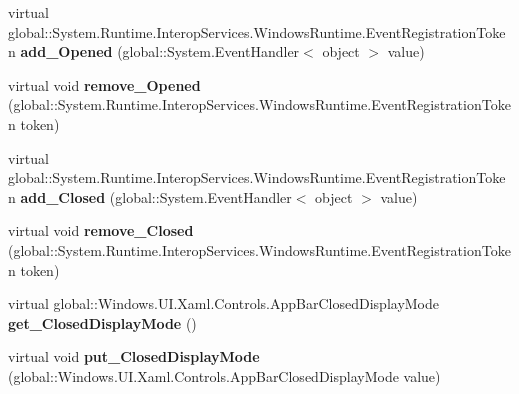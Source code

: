 \begin{DoxyCompactItemize}
\mbox{\label{class_windows_1_1_u_i_1_1_xaml_1_1_controls_1_1_app_bar_ad5f3931660e32abe22fcee131b86c49d}} 
virtual global\+::\+System.\+Runtime.\+Interop\+Services.\+Windows\+Runtime.\+Event\+Registration\+Token {\bfseries add\+\_\+\+Opened} (global\+::\+System.\+Event\+Handler$<$ object $>$ value)
\item 
\mbox{\label{class_windows_1_1_u_i_1_1_xaml_1_1_controls_1_1_app_bar_ac34208d86f3483385078caf53adad003}} 
virtual void {\bfseries remove\+\_\+\+Opened} (global\+::\+System.\+Runtime.\+Interop\+Services.\+Windows\+Runtime.\+Event\+Registration\+Token token)
\item 
\mbox{\label{class_windows_1_1_u_i_1_1_xaml_1_1_controls_1_1_app_bar_a4a1f77613cd6cf4250c8b5d04fb9f853}} 
virtual global\+::\+System.\+Runtime.\+Interop\+Services.\+Windows\+Runtime.\+Event\+Registration\+Token {\bfseries add\+\_\+\+Closed} (global\+::\+System.\+Event\+Handler$<$ object $>$ value)
\item 
\mbox{\label{class_windows_1_1_u_i_1_1_xaml_1_1_controls_1_1_app_bar_a3ae78268589fb871f3fba9dbb13e32b4}} 
virtual void {\bfseries remove\+\_\+\+Closed} (global\+::\+System.\+Runtime.\+Interop\+Services.\+Windows\+Runtime.\+Event\+Registration\+Token token)
\item 
\mbox{\label{class_windows_1_1_u_i_1_1_xaml_1_1_controls_1_1_app_bar_a46d37ed2b539c5c23c95c2f3d1bbe080}} 
virtual global\+::\+Windows.\+U\+I.\+Xaml.\+Controls.\+App\+Bar\+Closed\+Display\+Mode {\bfseries get\+\_\+\+Closed\+Display\+Mode} ()
\item 
\mbox{\label{class_windows_1_1_u_i_1_1_xaml_1_1_controls_1_1_app_bar_a1a13c7a737fd9dc3411f69e637231233}} 
virtual void {\bfseries put\+\_\+\+Closed\+Display\+Mode} (global\+::\+Windows.\+U\+I.\+Xaml.\+Controls.\+App\+Bar\+Closed\+Display\+Mode value)
\item 
\mbox{\label{class_windows_1_1_u_i_1_1_xaml_1_1_controls_1_1_app_bar_a2e23c12e2a789785cc3543b45ad5e974}} 

\end{DoxyCompactItemize}
